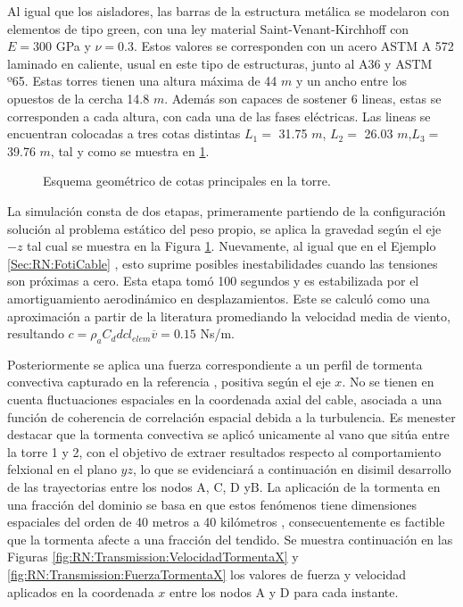 Al igual que los aisladores, las barras de la estructura metálica se modelaron con elementos de tipo green, con una ley material Saint-Venant-Kirchhoff con $E= 300$ GPa y $\nu=0.3$. Estos valores se corresponden con un acero  ASTM A 572 laminado en caliente, usual en este tipo de estructuras, junto al A36 y ASTM º65. Estas torres tienen una altura máxima de 44 $m$ y un ancho entre los opuestos de la cercha 14.8 $m$. Además son capaces de sostener 6 lineas, estas se corresponden a cada altura, con cada una de las fases eléctricas. Las lineas se encuentran colocadas a tres cotas distintas $L_1=$ 31.75 $m$, $L_2=$ 26.03 $m$,$L_3=$ 39.76 $m$, tal y como se muestra en \ref{fig:RN:Transmission:Torre}. 

\begin{figure}[h]
	\centering
	\def\svgwidth{80mm}
	
	\caption{Esquema geométrico de cotas principales en la torre. }
	\label{fig:RN:Transmission:Torre}
\end{figure}

La simulación consta de dos etapas, primeramente partiendo de la configuración solución al problema estático del peso propio, se aplica la gravedad según el eje $-z$ tal cual se muestra en la Figura \ref{fig:RN:Transmission:Torre}. Nuevamente, al igual que en el Ejemplo \ref{Sec:RN:FotiCable} , esto suprime posibles inestabilidades cuando las tensiones son próximas a cero. Esta etapa tomó 100 segundos y es estabilizada por el amortiguamiento aerodinámico en desplazamientos. Este se calculó como una aproximación a partir de la literatura \cite{matheson1981simulation} promediando la velocidad media de viento, resultando $c=\rho_a C_d dc l_{elem} \overline{v}=0.15$ Ns/m.

 Posteriormente se aplica una fuerza correspondiente a un perfil de tormenta convectiva capturado en la referencia \cite{stengel2017measurements}, positiva según el eje $x$. No se tienen en cuenta fluctuaciones espaciales en la coordenada axial del cable, asociada a una función de coherencia de correlación espacial debida a la turbulencia. Es menester destacar que la tormenta convectiva se aplicó unicamente al vano que sitúa entre la torre 1 y 2, con el objetivo de extraer resultados respecto al comportamiento felxional en el plano $yz$, lo que se evidenciará a continuación en disimil desarrollo de las trayectorias entre los nodos $\text{A}$, $\text{C}$, $\text{D}$ y$\text{B}$. La aplicación de la tormenta en una fracción del dominio se basa en que estos fenómenos tiene dimensiones espaciales del orden de 40 metros a 40 kilómetros \textcite{fujita1985downburst}, consecuentemente es factible que la tormenta afecte a una fracción del tendido. Se muestra continuación en las Figuras \ref{fig:RN:Transmission:VelocidadTormentaX} y \ref{fig:RN:Transmission:FuerzaTormentaX} los valores de fuerza y velocidad aplicados en la coordenada $x$ entre los nodos A y D para cada instante.

